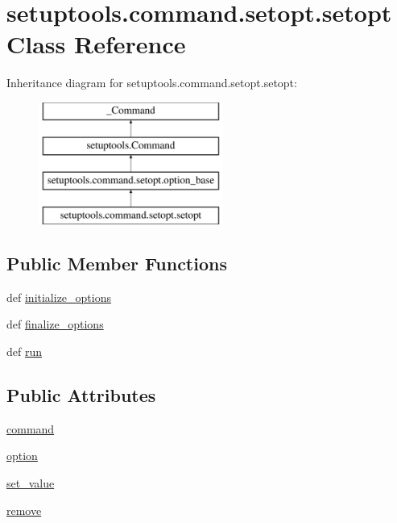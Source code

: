 \hypertarget{classsetuptools_1_1command_1_1setopt_1_1setopt}{}\section{setuptools.\+command.\+setopt.\+setopt Class Reference}
\label{classsetuptools_1_1command_1_1setopt_1_1setopt}
Inheritance diagram for setuptools.\+command.\+setopt.\+setopt\+:\begin{figure}[H]
\begin{center}
\leavevmode
\includegraphics[height=4.000000cm]{classsetuptools_1_1command_1_1setopt_1_1setopt}
\end{center}
\end{figure}
\subsection*{Public Member Functions}
\begin{DoxyCompactItemize}
\item 
def \hyperlink{classsetuptools_1_1command_1_1setopt_1_1setopt_ad9fabb6da3d121582be32a558ff2ce92}{initialize\+\_\+options}
\item 
def \hyperlink{classsetuptools_1_1command_1_1setopt_1_1setopt_ac19654f144b1c5f722ea520c907fe4ce}{finalize\+\_\+options}
\item 
def \hyperlink{classsetuptools_1_1command_1_1setopt_1_1setopt_ac1ba227f6adae7ed26f80adc43e0f9a2}{run}
\end{DoxyCompactItemize}
\subsection*{Public Attributes}
\begin{DoxyCompactItemize}
\item 
\hyperlink{classsetuptools_1_1command_1_1setopt_1_1setopt_a661e8cc13e8f2ad16bd1786e0557eaf3}{command}
\item 
\hyperlink{classsetuptools_1_1command_1_1setopt_1_1setopt_aaeecee84249dd61d1244d7d0f5fe4b57}{option}
\item 
\hyperlink{classsetuptools_1_1command_1_1setopt_1_1setopt_ae7d35dee0885a7f5eeefd36772e47ed5}{set\+\_\+value}
\item 
\hyperlink{classsetuptools_1_1command_1_1setopt_1_1setopt_ad1ad67d2184093424704a1b6253da442}{remove}
\end{DoxyCompactItemize}
